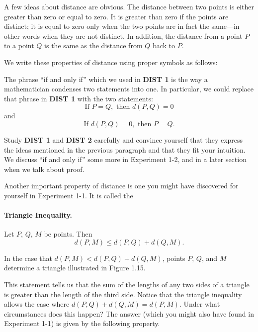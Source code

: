 \documentclass[12pt]{book} %
\begin{document}
A few ideas about distance are obvious. The distance between two points is either greater than zero or equal to zero. It is greater than zero if the points are distinct; it is equal to zero only when the two points are in fact the same---in other words when they are not distinct. In addition, the distance from a point $P$ to a point $Q$ is the same as the distance from $Q$ back to $P$.

We write these properties of distance using proper symbols as follows:



The phrase ``if and only if'' which we used in \textbf{DIST 1} is the way a mathematician condenses two statements into one. In particular, we could replace that phrase in \textbf{DIST 1} with the two statements:
\[
\text{If } P=Q,\text{ then } d(P,Q)=0
\]
and
\[
\text{If } d(P,Q)=0,\text{ then } P=Q.
\]

Study \textbf{DIST 1} and \textbf{DIST 2} carefully and convince yourself that they express the ideas mentioned in the previous paragraph and that they fit your intuition. We discuss ``if and only if'' some more in Experiment 1-2, and in a later section when we talk about proof.

Another important property of distance is one you might have discovered for yourself in Experiment 1-1. It is called the

\paragraph{Triangle Inequality.}
Let $P$, $Q$, $M$ be points. Then
\[
d(P,M)\le d(P,Q)+d(Q,M).
\]

In the case that $d(P,M)<d(P,Q)+d(Q,M)$, points $P$, $Q$, and $M$ determine a triangle illustrated in Figure 1.15.


This statement tells us that the sum of the lengths of any two sides of a triangle is greater than the length of the third side. Notice that the triangle inequality allows the case where $d(P,Q)+d(Q,M)=d(P,M)$. Under what circumstances does this happen? The answer (which you might also have found in Experiment 1-1) is given by the following property.
\end{document}
